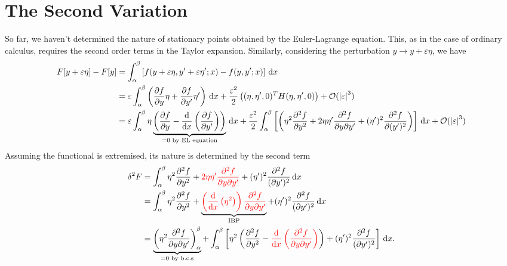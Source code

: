 \documentclass{article}
\theoremstyle{nonumberplain}
\begin{document}
\section{The Second Variation}
So far, we haven't determined the nature of stationary points obtained by the Euler-Lagrange equation. This, as in the case of ordinary calculus, requires the second order terms in the Taylor expansion. Similarly, considering the perturbation $y \to y + \varepsilon \eta $, we have
\[
    \begin{aligned}
        F[y+\varepsilon \eta] - F[y]
        &= \int_{\alpha }^{\beta } \left[ f(y+\varepsilon \eta , y^\prime + \varepsilon \eta ^\prime ; x) - f(y,y^\prime  ; x)\right] \,\mathrm{d}x \\
        &= \varepsilon \int_{\alpha }^{\beta } \left(\frac{\partial f}{\partial y} \eta  + \frac{\partial f}{\partial y^\prime } \eta ^\prime  \right) \,\mathrm{d}x 
        + \frac{\varepsilon^{2}}{2} \left(
            (\eta , \eta ^\prime , 0)^T H (\eta , \eta ^\prime , 0)
        \right) 
        + \mathcal{\MakeUppercase{O}} (\left\vert \varepsilon  \right\vert ^3)\\ 
        &= \varepsilon \int_{\alpha }^{\beta } \eta \underbrace{\left(\frac{\partial f}{\partial y}  - \frac{\mathrm{d}}{\mathrm{d}x} \left( \frac{\partial f}{\partial y^\prime } \right)  \right)}_{=0 \text{ by EL equation}} \,\mathrm{d}x 
        + \frac{\varepsilon^{2}}{2} \int_{\alpha }^{\beta } \left[ \left(
            \eta ^2 \frac{\partial ^2 f}{\partial y^2}  
            + 2 \eta  \eta ^\prime  \frac{\partial ^2f}{\partial y \partial y^\prime } 
            + (\eta ^\prime )^2 \frac{\partial ^2f}{\partial (y^\prime )^2}  
        \right) \right] \,\mathrm{d}x 
        + \mathcal{\MakeUppercase{O}} (\left\vert \varepsilon  \right\vert ^3)
    \end{aligned}
\]
Assuming the functional is extremised, its nature is determined by the second term 
\[
    \begin{aligned}
    \delta ^2 F 
    &= \int_{\alpha }^{\beta } \eta ^2 \frac{\partial ^2 f}{\partial y^2}  
    + \textcolor{red}{2 \eta  \eta ^\prime \frac{\partial ^2f}{\partial y \partial y^\prime } }  
    + (\eta ^\prime )^2 \frac{\partial ^2f}{(\partial y^\prime )^2}   \,\mathrm{d}x  \\ 
    &= \int_{\alpha }^{\beta } \eta ^2 \frac{\partial ^2 f}{\partial y^2}  
    + \underbrace{\textcolor{red}{\left(\frac{\mathrm{d}}{\mathrm{d}x} \left(\eta ^2\right)\right) \frac{\partial ^2f}{\partial y \partial y^\prime } } }_{\text{IBP}}
    + (\eta ^\prime )^2 \frac{\partial ^2f}{(\partial y^\prime )^2}   \,\mathrm{d}x  \\ 
    &= \underbrace{\left( \eta^2 \frac{\partial ^2f}{\partial y \partial y^\prime }\right)^\beta_\alpha}_{=0 \text{ by b.c.s}}
    + \int_{\alpha }^{\beta } \left[ 
        \eta ^2 \left(
            \frac{\partial ^2 f}{\partial y^2}  - \textcolor{red}{\frac{\mathrm{d}}{\mathrm{d}x} \left( \frac{\partial ^2f}{\partial y \partial y^\prime } \right)}
        \right) 
        + (\eta ^\prime )^2 \frac{\partial ^2f}{(\partial y^\prime )^2} 
    \right]  \,\mathrm{d}x . \\ 
    \end{aligned}
\]
\end{document}
